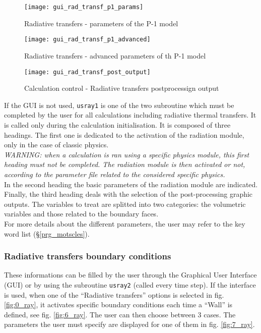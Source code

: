 {{\begin{figure}[ht]
\begin{center}
\texttt{[image: gui\_rad\_transf\_p1\_params]}
\caption{Radiative transfers - parameters of the P-1 model}
\label{fig:3_ray}
\end{center}
\end{figure}

\begin{figure}[ht]
\begin{center}
\texttt{[image: gui\_rad\_transf\_p1\_advanced]}
\caption{Radiative transfers - advanced parameters of th P-1 model}
\label{fig:4_ray}
\end{center}
\end{figure}

\begin{figure}[ht]
\begin{center}
\texttt{[image: gui\_rad\_transf\_post\_output]}
\caption{Calculation control - Radiative transfers postprocessign output}
\label{fig:5_ray}
\end{center}
\end{figure}

If the GUI is not used, \texttt{usray1} is one of the two subroutine which must be completed by the user for all
calculations including radiative thermal transfers. It is called only during the calculation initialisation. It is composed of three headings. The first one is dedicated to the activation
of the radiation module, only in the case of classic physics. \\
{\em WARNING: when a calculation is ran using a specific physics module,
this first heading must not be completed. The radiation module is then
activated or not, according to the parameter file related to the considered
specific physics.} \\

\noindent
In the second heading the basic parameters of the radiation module are indicated.\\
Finally, the third heading deals with the selection of the
post-processing graphic outputs. The variables to treat are splitted
into two categories: the volumetric variables and those related to the
boundary faces.\\

\noindent
For more details about the different parameters, the user may refer to the
key word list (\S\ref{prg_motscles}).


\subsubsection{Radiative transfers boundary conditions}
These informations can be filled by the user through the Graphical User Interface (GUI) or by using the subroutine \texttt{usray2} (called every time step). If the interface is used, when one of the ``Radiative transfers'' options is selected in fig. \ref{fig:0_ray}, it activates specific boundary conditions each time a ``Wall'' is defined, see fig. \ref{fig:6_ray}. The user can then choose between 3 cases. The parameters the user must specify are displayed for one of them in fig. \ref{fig:7_ray}.
 
}}
